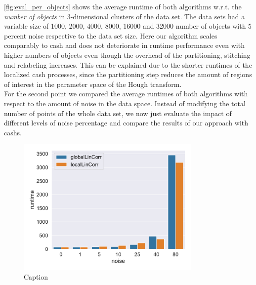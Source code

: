 \autoref{fig:eval_per_objects} shows the average runtime of both algorithms w.r.t. the \textit{number of objects} in 3-dimensional clusters of the data set. The data sets had a variable size of 1000, 2000, 4000, 8000, 16000 and 32000 number of objects with 5 percent noise respective to the data set size. Here our algorithm scales comparably to \gls{cash} and does not deteriorate in runtime performance even with higher numbers of objects even though the overhead of the partitioning, stitching and relabeling increases. This can be explained due to the shorter runtimes of the localized \gls{cash} processes, since the partitioning step reduces the amount of regions of interest in the parameter space of the Hough transform.\\

For the second point we compared the average runtimes of both algorithms with respect to the amount of noise in the data space. Instead of modifying the total number of points of the whole data set, we now just evaluate the impact of different levels of noise percentage and compare the results of our approach with \gls{cash}s.


\begin{figure}[h]
    \centering
        \includegraphics[width=0.8\textwidth]{evaluation/per_noise/Avg_Runtime_3D_O10000_pnoise_bar.pdf}
    \caption{Caption}
    \label{fig:eval_per_noise}
\end{figure}

